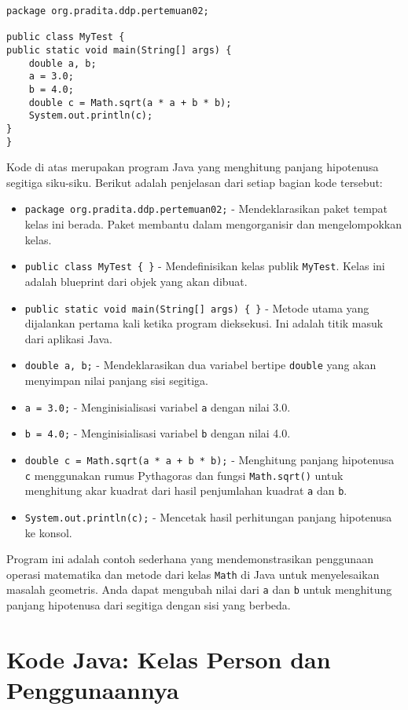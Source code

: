 \begin{lstlisting}[style=JavaStyle, caption={Kode Java: MyTest.java}]
package org.pradita.ddp.pertemuan02;

public class MyTest {
public static void main(String[] args) {
	double a, b;
	a = 3.0;
	b = 4.0;
	double c = Math.sqrt(a * a + b * b);
	System.out.println(c);
}
}
\end{lstlisting}

Kode di atas merupakan program Java yang menghitung panjang hipotenusa segitiga siku-siku. Berikut adalah penjelasan dari setiap bagian kode tersebut:

\begin{itemize}
\item \texttt{package org.pradita.ddp.pertemuan02;} - Mendeklarasikan paket tempat kelas ini berada. Paket membantu dalam mengorganisir dan mengelompokkan kelas.
\item \texttt{public class MyTest \{ \}} - Mendefinisikan kelas publik \texttt{MyTest}. Kelas ini adalah blueprint dari objek yang akan dibuat.
\item \texttt{public static void main(String[] args) \{ \}} - Metode utama yang dijalankan pertama kali ketika program dieksekusi. Ini adalah titik masuk dari aplikasi Java.
\item \texttt{double a, b;} - Mendeklarasikan dua variabel bertipe \texttt{double} yang akan menyimpan nilai panjang sisi segitiga.
\item \texttt{a = 3.0;} - Menginisialisasi variabel \texttt{a} dengan nilai 3.0.
\item \texttt{b = 4.0;} - Menginisialisasi variabel \texttt{b} dengan nilai 4.0.
\item \texttt{double c = Math.sqrt(a * a + b * b);} - Menghitung panjang hipotenusa \texttt{c} menggunakan rumus Pythagoras dan fungsi \texttt{Math.sqrt()} untuk menghitung akar kuadrat dari hasil penjumlahan kuadrat \texttt{a} dan \texttt{b}.
\item \texttt{System.out.println(c);} - Mencetak hasil perhitungan panjang hipotenusa ke konsol.
\end{itemize}

Program ini adalah contoh sederhana yang mendemonstrasikan penggunaan operasi matematika dan metode dari kelas \texttt{Math} di Java untuk menyelesaikan masalah geometris. Anda dapat mengubah nilai dari \texttt{a} dan \texttt{b} untuk menghitung panjang hipotenusa dari segitiga dengan sisi yang berbeda.

\section{Kode Java: Kelas Person dan Penggunaannya}

